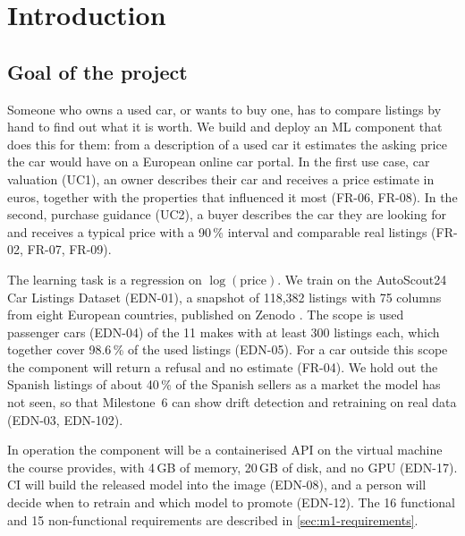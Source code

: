 \section{Introduction}
\label{sec:introduction}

\subsection{Goal of the project}
\label{sec:goal}

Someone who owns a used car, or wants to buy one, has to compare listings by hand to find out what it is worth.
We build and deploy an ML component that does this for them: from a description of a used car it estimates the asking price the car would have on a European online car portal.
In the first use case, car valuation (UC1), an owner describes their car and receives a price estimate in euros, together with the properties that influenced it most (FR-06, FR-08).
In the second, purchase guidance (UC2), a buyer describes the car they are looking for and receives a typical price with a 90\,\% interval and comparable real listings (FR-02, FR-07, FR-09).

The learning task is a regression on $\log(\mathrm{price})$.
We train on the AutoScout24 Car Listings Dataset (EDN-01), a snapshot of 118,382 listings with 75 columns from eight European countries, published on Zenodo \cite{celik2025autoscout24}.
The scope is used passenger cars (EDN-04) of the 11 makes with at least 300 listings each, which together cover 98.6\,\% of the used listings (EDN-05).
For a car outside this scope the component will return a refusal and no estimate (FR-04).
We hold out the Spanish listings of about 40\,\% of the Spanish sellers as a market the model has not seen, so that Milestone~6 can show drift detection and retraining on real data (EDN-03, EDN-102).

In operation the component will be a containerised API on the virtual machine the course provides, with 4\,GB of memory, 20\,GB of disk, and no GPU (EDN-17).
CI will build the released model into the image (EDN-08), and a person will decide when to retrain and which model to promote (EDN-12).
The 16 functional and 15 non-functional requirements are described in \cref{sec:m1-requirements}.

